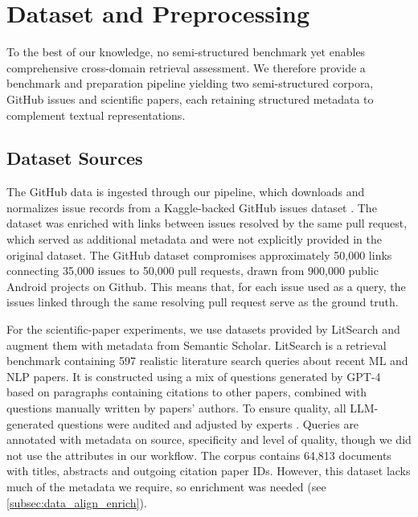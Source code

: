 \documentclass[11pt]{article}
\begin{document}
\section{Dataset and Preprocessing}

To the best of our knowledge, no semi-structured benchmark yet enables comprehensive cross-domain retrieval assessment. We therefore provide a benchmark and preparation pipeline yielding two semi-structured corpora, GitHub issues and scientific papers, each retaining structured metadata to complement textual representations.

\subsection{Dataset Sources}

The GitHub data is ingested through our pipeline, which downloads and normalizes issue records from a Kaggle-backed GitHub issues dataset \cite{alshara_pi-link_2023, zakarea_alshara_2022}. The dataset was enriched with links between issues resolved by the same pull request, which served as additional metadata and were not explicitly provided in the original dataset. The GitHub dataset compromises approximately 50,000 links connecting 35,000 issues to 50,000 pull requests, drawn from 900,000 public Android projects on Github. This means that, for each issue used as a query, the issues linked through the same resolving pull request serve as the ground truth.

For the scientific-paper experiments, we use datasets provided by LitSearch \cite{princeton_princeton-nlplitsearch_2026} and augment them with metadata from Semantic Scholar. LitSearch is a retrieval benchmark containing 597 realistic literature search queries about recent ML and NLP papers. It is constructed using a mix of questions generated by GPT-4 based on paragraphs containing citations to other papers, combined with questions manually written by papers' authors. To ensure quality, all LLM-generated questions were audited and adjusted by experts \cite{ajith_litsearch_2024}. Queries are annotated with metadata on source, specificity and level of quality, though we did not use the attributes in our workflow. The corpus contains 64,813 documents with titles, abstracts and outgoing citation paper IDs. However, this dataset lacks much of the metadata we require, so enrichment was needed (see \ref{subsec:data_align_enrich}). \\
\end{document}
